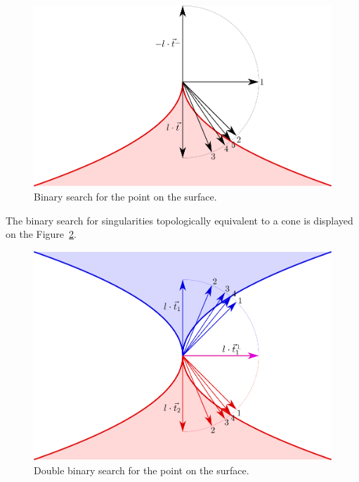 \begin{figure}
    \centerline{\includegraphics[scale=0.5]{images/img41}}
    \caption[Binary search for the point on the surface]
    {Binary search for the point on the surface.}
    \label{img:41}
\end{figure}

The binary search for singularities topologically equivalent to a cone is displayed
on the Figure~\ref{img:45}.

\begin{figure}
    \centerline{\includegraphics[scale=0.5]{images/img45}}
    \caption[Double binary search for the point on the surface]
    {Double binary search for the point on the surface.}
    \label{img:45}
\end{figure}

